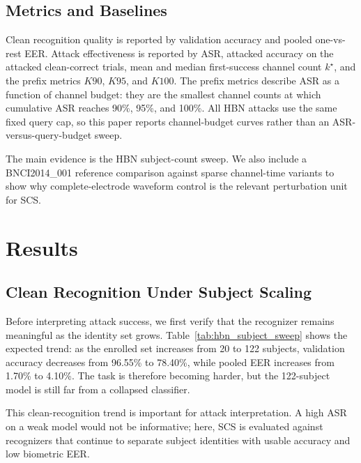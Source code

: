 \documentclass[journal]{IEEEtran}
\begin{document}
\subsection{Metrics and Baselines}

Clean recognition quality is reported by validation accuracy and pooled one-vs-rest EER. Attack effectiveness is reported by ASR, attacked accuracy on the attacked clean-correct trials, mean and median first-success channel count $k^\star$, and the prefix metrics $K90$, $K95$, and $K100$. The prefix metrics describe ASR as a function of channel budget: they are the smallest channel counts at which cumulative ASR reaches 90\%, 95\%, and 100\%. All HBN attacks use the same fixed query cap, so this paper reports channel-budget curves rather than an ASR-versus-query-budget sweep.

The main evidence is the HBN subject-count sweep. We also include a BNCI2014\_001 reference comparison against sparse channel-time variants to show why complete-electrode waveform control is the relevant perturbation unit for SCS.

\section{Results}

\subsection{Clean Recognition Under Subject Scaling} 

Before interpreting attack success, we first verify that the recognizer remains meaningful as the identity set grows. Table~\ref{tab:hbn_subject_sweep} shows the expected trend: as the enrolled set increases from 20 to 122 subjects, validation accuracy decreases from 96.55\% to 78.40\%, while pooled EER increases from 1.70\% to 4.10\%. The task is therefore becoming harder, but the 122-subject model is still far from a collapsed classifier.

This clean-recognition trend is important for attack interpretation. A high ASR on a weak model would not be informative; here, SCS is evaluated against recognizers that continue to separate subject identities with usable accuracy and low biometric EER.
\end{document}

